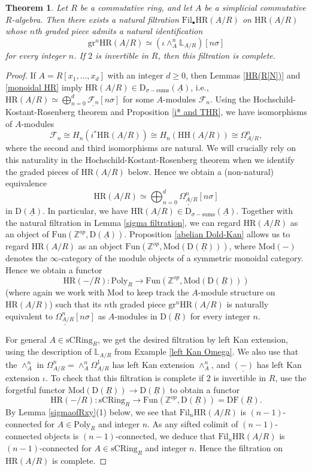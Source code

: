 \documentclass[10pt]{amsart}
\newtheorem{thm}{Theorem}[section]
\theoremstyle{definition}
\numberwithin{equation}{section}
\renewcommand{\L}{\mathbb{L}}
\newcommand{\Z}{\mathbb{Z}}
\newcommand{\cF}{\mathcal{F}}
\newcommand{\rD}{\mathrm{D}}
\newcommand{\ul}{\underline}
\newcommand{\sCRing}{\mathrm{sCRing}}
\newcommand{\Fun}{\mathrm{Fun}}
\newcommand{\Mod}{\mathrm{Mod}}
\newcommand{\Poly}{\mathrm{Poly}}
\newcommand{\DF}{\mathrm{DF}}
\newcommand{\gr}{\mathrm{gr}}
\newcommand{\Fil}{\mathrm{Fil}}
\newcommand{\HH}{\mathrm{HH}}
\newcommand{\HR}{\mathrm{HR}}
\begin{document}
\begin{thm}\label{HRfiltration}
Let $R$ be a commutative ring,
and let $A$ be a simplicial commutative $R$-algebra.
Then there exists a natural filtration $\Fil_\bullet \HR(A/R)$ on $\HR(A/R)$ whose $n$th graded piece admits a natural identification
\[
\gr^n \HR(A/R)
\simeq
(\iota \wedge_{A}^n  \L_{A/R})[n\sigma]
\]
for every integer $n$.
If $2$ is invertible in $R$,
then this filtration is complete.
\end{thm}
\begin{proof}
If $A=R[x_1,\ldots,x_d]$ with an integer $d\geq 0$,
then Lemmas \ref{HR(R[N])} and \ref{monoidal HR} imply $\HR(A/R)\in \rD_{\sigma-\mathrm{sums}}(\ul{A})$,
 i.e.,
$\HR(A/R)\simeq \bigoplus_{n=0}^d\ul{\cF_n}[n\sigma]$ for some $A$-modules $\cF_n$.
Using the Hochschild-Kostant-Rosenberg theorem
and Proposition \ref{i* and THR},
we have isomorphisms of $A$-modules
\[
\cF_n
\cong
H_n(i^* \HR(A/R))
\cong
H_n(\HH(A/R))
\cong
\Omega_{A/R}^n,
\]
where the second and third isomorphisms are natural. We will crucially rely on this naturality in the Hochschild-Kostant-Rosenberg theorem when we identify the graded pieces of $\HR(A/R)$ below.
Hence we obtain a (non-natural)
equivalence
\begin{equation}
\label{HRomegasum}
\HR(A/R)
\simeq
\bigoplus_{n=0}^d
\ul{\Omega_{A/R}^n}[n\sigma]
\end{equation}
in $\rD(\ul{A})$.
In particular, we have $\HR(A/R)\in \rD_{\sigma-\mathrm{sums}}(\ul{A})$.
Together with the natural filtration in Lemma \ref{sigma filtration},
we can regard $\HR(A/R)$ as an object of $\Fun(\Z^{op},\rD(\ul{A}))$.
Proposition \ref{abelian Dold-Kan}
allows us to regard $\HR(A/R)$ as an object $\Fun(\Z^{op},\Mod(\rD(\ul{R})))$,
where $\Mod(-)$ denotes the $\infty$-category of the module objects of a symmetric monoidal category.
Hence we obtain a functor
\[
\HR(-/R)
\colon
\Poly_R
\to
\Fun(\Z^{op},\Mod(\rD(\ul{R})))
\]
(where again we work with $\Mod$ to keep track the $A$-module structure on $\HR(A/R)$) 
such that its $n$th graded piece $\gr^n\HR(A/R)$ is naturally equivalent to $\underline{\Omega_{A/R}^n} [n\sigma]$ as $A$-modules in $\rD(\ul{R})$ for every integer $n$.

For general $A\in \sCRing_R$,
we get the desired filtration by left Kan extension,
using the description of $\L_{A/R}$ from Example \ref{left Kan Omega}.
We also use that the $\wedge_A^n$ in $\Omega_{A/R}^n=\wedge_A^n \Omega_{A/R}^1$ has left Kan extension $\wedge_A^n$, and $\ul{(-)}$ has left Kan extension $\iota$.
To check that this filtration is complete if $2$ is invertible in $R$,
use the forgetful functor $\Mod(\rD(\ul{R}))\to \rD(\ul{R})$ to obtain a functor
\[
\HR(-/R)\colon \sCRing_R\to \Fun(\Z^{op},\rD(\ul{R}))=\DF(\ul{R}).
\]
By Lemma \ref{sigmaofRxy}(1) below,
we see that $\Fil_n\HR(A/R)$ is $(n-1)$-connected for $A\in \Poly_R$ and integer $n$.
As any sifted colimit of $(n-1)$-connected objects is $(n-1)$-connected, 
we deduce that $\Fil_n\HR(A/R)$ is $(n-1)$-connected for
$A\in \sCRing_R$ and integer $n$.
Hence the filtration on $\HR(A/R)$ is complete.
\end{proof}
\end{document}
